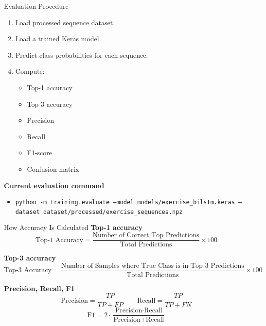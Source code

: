 \documentclass[aspectratio=169]{beamer}
\begin{document}
\begin{frame}{Evaluation Procedure}
\small
\begin{enumerate}
  \item Load processed sequence dataset.
  \item Load a trained Keras model.
  \item Predict class probabilities for each sequence.
  \item Compute:
  \begin{itemize}
    \item Top-1 accuracy
    \item Top-3 accuracy
    \item Precision
    \item Recall
    \item F1-score
    \item Confusion matrix
  \end{itemize}
\end{enumerate}

\vspace{0.2cm}
\textbf{Current evaluation command}
\begin{itemize}
  \item \texttt{python -m training.evaluate --model models/exercise\_bilstm.keras --dataset dataset/processed/exercise\_sequences.npz}
\end{itemize}
\end{frame}

\begin{frame}{How Accuracy Is Calculated}
\small
\textbf{Top-1 accuracy}
\[
\text{Top-1 Accuracy}=
\frac{\text{Number of Correct Top Predictions}}{\text{Total Predictions}}\times 100
\]

\textbf{Top-3 accuracy}
\[
\text{Top-3 Accuracy}=
\frac{\text{Number of Samples where True Class is in Top 3 Predictions}}{\text{Total Predictions}}\times 100
\]

\textbf{Precision, Recall, F1}
\[
\text{Precision} = \frac{TP}{TP+FP}
\qquad
\text{Recall} = \frac{TP}{TP+FN}
\]
\[
\text{F1} = 2 \cdot \frac{\text{Precision}\cdot\text{Recall}}{\text{Precision}+\text{Recall}}
\]
\end{frame}
\end{document}
